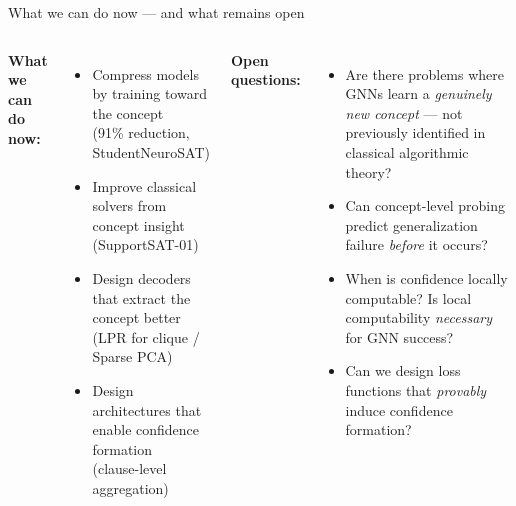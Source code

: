 \documentclass[aspectratio=169,10pt,dvipsnames]{beamer}
\begin{document}
\begin{frame}{What we can do now — and what remains open}

\begin{columns}[T]
\textbf{What we can do now:}
\begin{itemize}
  \item Compress models by training toward the concept\\
    {\small(91\% reduction, StudentNeuroSAT)}
  \item Improve classical solvers from concept insight\\
    {\small(SupportSAT-01)}
  \item Design decoders that extract the concept better\\
    {\small(LPR for clique / Sparse PCA)}
  \item Design architectures that enable confidence formation\\
    {\small(clause-level aggregation)}
\end{itemize}

\textbf{Open questions:}
\begin{itemize}
  \item Are there problems where GNNs learn a \textit{genuinely new concept} — not previously identified in classical algorithmic theory?
  \item Can concept-level probing predict generalization failure \textit{before} it occurs?
  \item When is confidence locally computable? Is local computability \textit{necessary} for GNN success?
  \item Can we design loss functions that \textit{provably} induce confidence formation?
\end{itemize}
\end{columns}

\end{frame}
\end{document}
